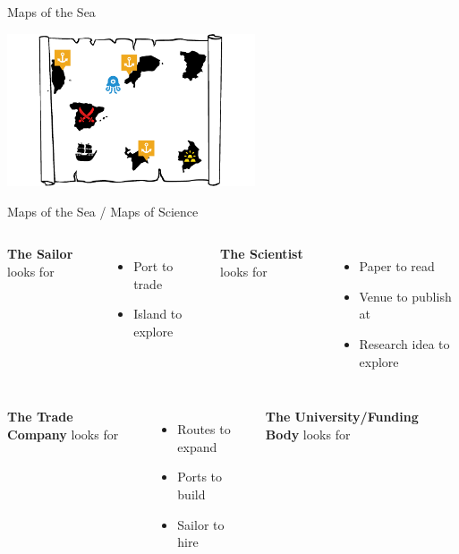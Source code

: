 \documentclass[en,16:9,smallfoot]{sdqbeamer}
\begin{document}
\begin{frame}{Maps of the Sea}
\begin{overprint}
            \centering\includegraphics[width=0.55\textwidth]{imgs/schema_analogy_04}
       \end{overprint}
   \end{frame}

   \begin{frame}[t]{Maps of the Sea / Maps of Science}
   \begin{overprint}
       \begin{columns}[t]
               {\large\textbf{The Sailor} looks for}
               \begin{itemize}
                   \item Port to trade
                   \item Island to explore
               \end{itemize}
               {\large\textbf{The Scientist} looks for}
               \begin{itemize}
                   \item Paper to read
                   \item Venue to publish at
                   \item Research idea to explore
               \end{itemize}
       \end{columns}
       \begin{columns}
               {\large\textbf{The Trade Company} looks for}
               \begin{itemize}
                   \item Routes to expand
                   \item Ports to build
                   \item Sailor to hire
               \end{itemize}
               {\large\textbf{The University/Funding Body} looks for}
               \begin{itemize}

\end{itemize}
\end{columns}
\end{overprint}
\end{frame}
\end{document}
